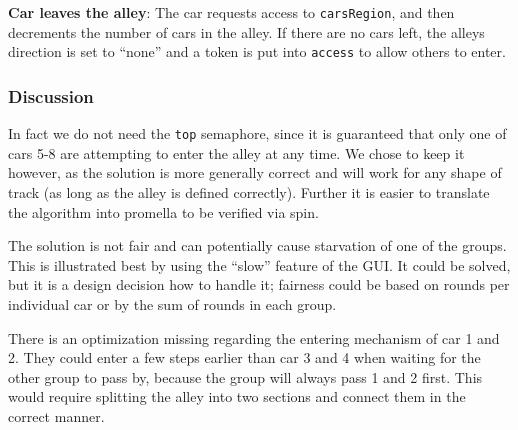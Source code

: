 \textbf{Car leaves the alley}: The car requests access to \texttt{carsRegion}, and then decrements the number of cars in the alley. If there are no cars left, the alleys direction is set to ``none'' and a token is put into \texttt{access} to allow others to enter.

\subsubsection{Discussion}

In fact we do not need the \texttt{top} semaphore, since it is guaranteed that only one of cars 5-8 are attempting to enter the alley at any time. We chose to keep it however, as the solution is more generally correct and will work for any shape of track (as long as the alley is defined correctly). Further it is easier to translate the algorithm into promella to be verified via spin.

The solution is not fair and can potentially cause starvation of one of the groups. This is illustrated best by using the ``slow'' feature of the GUI. It could be solved, but it is a design decision how to handle it; fairness could be based on rounds per individual car or by the sum of rounds in each group.

There is an optimization missing regarding the entering mechanism of car 1 and 2. They could enter a few steps earlier than car 3 and 4 when waiting for the other group to pass by, because the group will always pass 1 and 2 first. This would require splitting the alley into two sections and connect them in the correct manner.

